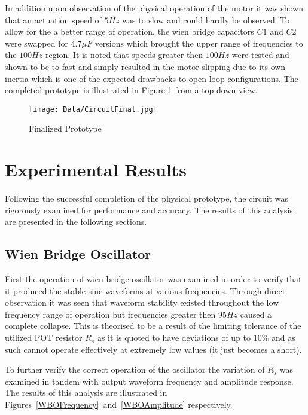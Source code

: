\documentclass[12pt]{article}
\begin{document}
In addition upon observation of the physical operation of the motor it was shown that an actuation speed of $5Hz$ was to slow and could hardly be observed. To allow for the a better range of operation, the wien bridge capacitors $C1$ and $C2$ were swapped for $4.7\mu F$ versions which brought the upper range of frequencies to the $100Hz$ region. It is noted that speeds greater then $100Hz$ were tested and shown to be to fast and simply resulted in the motor slipping due to its own inertia which is one of the expected drawbacks to open loop configurations. The completed prototype is illustrated in Figure \ref{CircuitFinal} from a top down view.

\begin{figure}[H]
\centering
\caption{Finalized Prototype}
\texttt{[image: Data/CircuitFinal.jpg]}
\label{CircuitFinal}
\end{figure}


\pagebreak
\section{Experimental Results}%

Following the successful completion of the physical prototype, the circuit was rigorously examined for performance and accuracy. The results of this analysis are presented in the following sections.

\subsection{Wien Bridge Oscillator}%

First the operation of wien bridge oscillator was examined in order to verify that it produced the stable sine waveforms at various frequencies. Through direct observation it was seen that waveform stability existed throughout the low frequency range of operation but frequencies greater then $95Hz$ caused a complete collapse. This is theorised to be a result of the limiting tolerance of the utilized POT resistor $R_s$ as it is quoted to have deviations of up to $10\%$ and as such cannot operate effectively at extremely low values (it just becomes a short). 

To further verify the correct operation of the oscillator the variation of $R_s$ was examined in tandem with output waveform frequency and amplitude response. The results of this analysis are illustrated in Figures~\ref{WBOFrequency}~and~\ref{WBOAmplitude} respectively.
\end{document}
